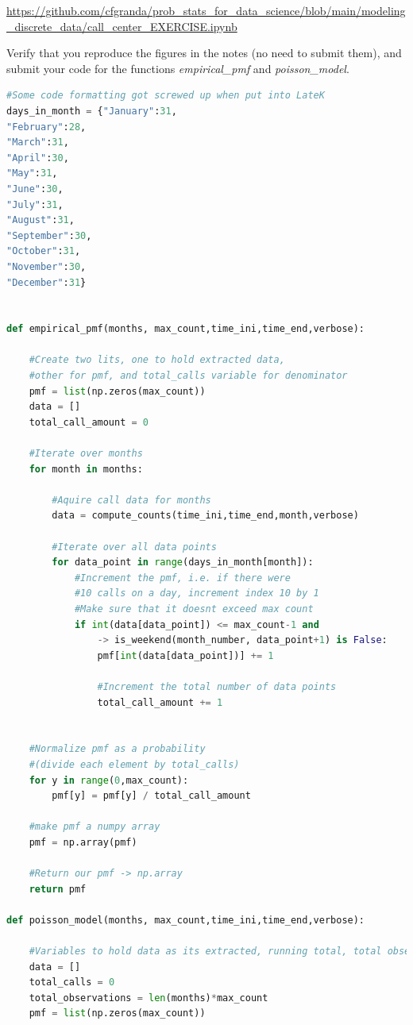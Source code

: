 \documentclass[12pt,twoside]{article}
\begin{document}
\begin{enumerate}
\url{https://github.com/cfgranda/prob_stats_for_data_science/blob/main/modeling_discrete_data/call_center_EXERCISE.ipynb}

Verify that you reproduce the figures in the notes (no need to submit them), and submit your code for the functions \emph{empirical\_pmf} and \emph{poisson\_model}.
\subitem
\begin{lstlisting}[language=Python]
#Some code formatting got screwed up when put into LateK
days_in_month = {"January":31,
"February":28,
"March":31,
"April":30,
"May":31,
"June":30,
"July":31,
"August":31,
"September":30,
"October":31,
"November":30,
"December":31}


def empirical_pmf(months, max_count,time_ini,time_end,verbose):
    
    #Create two lits, one to hold extracted data, 
    #other for pmf, and total_calls variable for denominator 
    pmf = list(np.zeros(max_count))
    data = []
    total_call_amount = 0
    
    #Iterate over months
    for month in months:
        
        #Aquire call data for months
        data = compute_counts(time_ini,time_end,month,verbose)
        
        #Iterate over all data points
        for data_point in range(days_in_month[month]):
            #Increment the pmf, i.e. if there were 
            #10 calls on a day, increment index 10 by 1
            #Make sure that it doesnt exceed max count
            if int(data[data_point]) <= max_count-1 and 
                -> is_weekend(month_number, data_point+1) is False:
                pmf[int(data[data_point])] += 1
                
                #Increment the total number of data points
                total_call_amount += 1
            
    
    #Normalize pmf as a probability
    #(divide each element by total_calls)
    for y in range(0,max_count):
        pmf[y] = pmf[y] / total_call_amount
        
    #make pmf a numpy array
    pmf = np.array(pmf)
    
    #Return our pmf -> np.array
    return pmf

def poisson_model(months, max_count,time_ini,time_end,verbose):
    
    #Variables to hold data as its extracted, running total, total observations, and pmf
    data = []
    total_calls = 0
    total_observations = len(months)*max_count
    pmf = list(np.zeros(max_count))
    

\end{lstlisting}
\end{enumerate}
\end{document}
